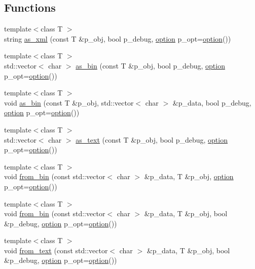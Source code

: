 \subsection*{Functions}
\begin{DoxyCompactItemize}
\item 
{\footnotesize template$<$class T $>$ }\\string \hyperlink{namespacextd_1_1serializer_aff0b24f230c8b5083104eccb94242a8c}{as\+\_\+xml} (const T \&p\+\_\+obj, bool p\+\_\+debug, \hyperlink{structxtd_1_1serializer_1_1option}{option} p\+\_\+opt=\hyperlink{structxtd_1_1serializer_1_1option}{option}())
\item 
{\footnotesize template$<$class T $>$ }\\std\+::vector$<$ char $>$ \hyperlink{namespacextd_1_1serializer_a0088e6d509f6652e58c7c0eea9102884}{as\+\_\+bin} (const T \&p\+\_\+obj, bool p\+\_\+debug, \hyperlink{structxtd_1_1serializer_1_1option}{option} p\+\_\+opt=\hyperlink{structxtd_1_1serializer_1_1option}{option}())
\item 
{\footnotesize template$<$class T $>$ }\\void \hyperlink{namespacextd_1_1serializer_a1c43eba643505bba5858d6d5431201fb}{as\+\_\+bin} (const T \&p\+\_\+obj, std\+::vector$<$ char $>$ \&p\+\_\+data, bool p\+\_\+debug, \hyperlink{structxtd_1_1serializer_1_1option}{option} p\+\_\+opt=\hyperlink{structxtd_1_1serializer_1_1option}{option}())
\item 
{\footnotesize template$<$class T $>$ }\\std\+::vector$<$ char $>$ \hyperlink{namespacextd_1_1serializer_a5ac463bb961b98f1b8b7c2655d2772db}{as\+\_\+text} (const T \&p\+\_\+obj, bool p\+\_\+debug, \hyperlink{structxtd_1_1serializer_1_1option}{option} p\+\_\+opt=\hyperlink{structxtd_1_1serializer_1_1option}{option}())
\item 
{\footnotesize template$<$class T $>$ }\\void \hyperlink{namespacextd_1_1serializer_a601beccda10ec2760c371d39045bec0e}{from\+\_\+bin} (const std\+::vector$<$ char $>$ \&p\+\_\+data, T \&p\+\_\+obj, \hyperlink{structxtd_1_1serializer_1_1option}{option} p\+\_\+opt=\hyperlink{structxtd_1_1serializer_1_1option}{option}())
\item 
{\footnotesize template$<$class T $>$ }\\void \hyperlink{namespacextd_1_1serializer_a76ec6ed068121fc7ff0f6514132c5683}{from\+\_\+bin} (const std\+::vector$<$ char $>$ \&p\+\_\+data, T \&p\+\_\+obj, bool \&p\+\_\+debug, \hyperlink{structxtd_1_1serializer_1_1option}{option} p\+\_\+opt=\hyperlink{structxtd_1_1serializer_1_1option}{option}())
\item 
{\footnotesize template$<$class T $>$ }\\void \hyperlink{namespacextd_1_1serializer_a27ea640a20bff130274562ddd8762c0a}{from\+\_\+text} (const std\+::vector$<$ char $>$ \&p\+\_\+data, T \&p\+\_\+obj, bool \&p\+\_\+debug, \hyperlink{structxtd_1_1serializer_1_1option}{option} p\+\_\+opt=\hyperlink{structxtd_1_1serializer_1_1option}{option}())
\end{DoxyCompactItemize}


